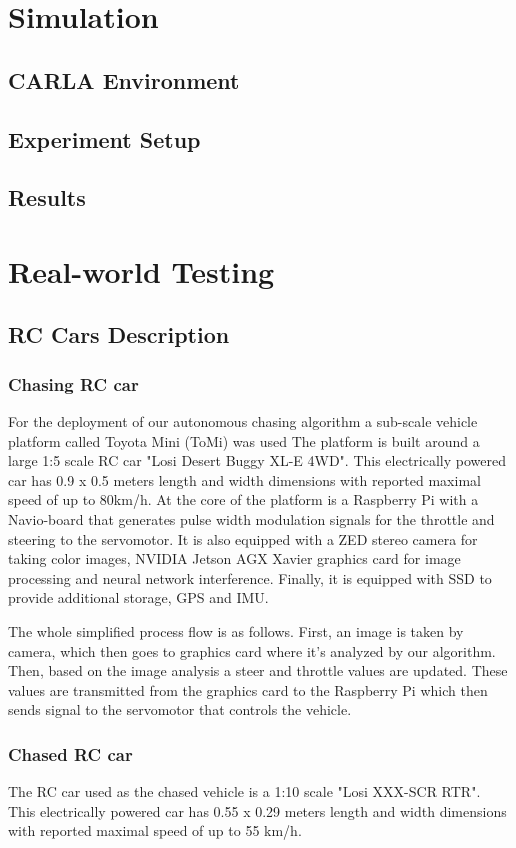 \section{Simulation}
\subsection{CARLA Environment}
\subsection{Experiment Setup}
\subsection{Results}

\section{Real-world Testing}
\subsection{RC Cars Description}
\subsubsection{Chasing RC car}
For the deployment of our autonomous chasing algorithm a sub-scale vehicle platform called Toyota Mini (ToMi) was used %
The platform is built around a large 1:5 scale RC car "Losi Desert Buggy XL-E 4WD". This electrically powered car has 0.9 x 0.5 meters length and width dimensions with reported maximal speed of up to 80km/h. At the core of the platform is a Raspberry Pi with a Navio-board that generates pulse width modulation signals for the throttle and steering to the servomotor. It is also equipped with a ZED stereo camera for taking color images, NVIDIA Jetson AGX Xavier graphics card for image processing and neural network interference. Finally, it is equipped with SSD to provide additional storage, GPS and IMU. \par
The whole simplified process flow is as follows. First, an image is taken by camera, which then goes to graphics card where it's analyzed by our algorithm. Then, based on the image analysis a steer and throttle values are updated. These values are transmitted from the graphics card to the Raspberry Pi which then sends signal to the servomotor that controls the vehicle.

\subsubsection{Chased RC car}
The RC car used as the chased vehicle is a 1:10 scale "Losi XXX-SCR RTR". This electrically powered car has 0.55 x 0.29 meters length and width dimensions with reported maximal speed of up to 55 km/h.

